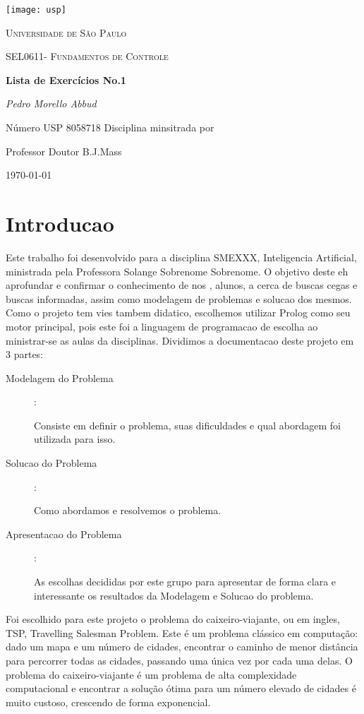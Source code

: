 \documentclass[12pt,a4paper]{article}
\begin{document}
\begin{titlepage}
  \centering
  \texttt{[image: usp]}\par\vspace{1cm}
  {\scshape\LARGE Universidade de São Paulo\par}
  \vspace{1cm}
  {\scshape\Large SEL0611- Fundamentos de Controle\par}
  \vspace{1.5cm}
  {\huge\bfseries Lista de Exercícios No.1\par}
  \vspace{2cm}
  {\Large\itshape Pedro Morello Abbud \par}
  \vspace{1cm}
  Número USP 8058718
  \vfill
  Disciplina minsitrada por\par
  Professor Doutor B.J.Mass

  \vfill 
  {\large \today\par}
\end{titlepage}
\newpage
\section{Introducao}
Este trabalho foi desenvolvido para a disciplina SMEXXX, Inteligencia Artificial, ministrada pela Professora Solange Sobrenome Sobrenome. O objetivo deste eh aprofundar e confirmar o conhecimento de nos , alunos, a cerca de buscas cegas e buscas informadas, assim como modelagem de problemas e solucao dos mesmos. Como o projeto tem vies tambem didatico, escolhemos utilizar Prolog como seu motor principal, pois este foi a linguagem de programacao de escolha ao ministrar-se as aulas da disciplinas. Dividimos a documentacao deste projeto em 3 partes:
\begin{description}
  \item [Modelagem do Problema]:

Consiste em definir o problema, suas dificuldades e qual abordagem foi utilizada para isso.
\item [Solucao do Problema]:

Como abordamos e resolvemos o problema.
\item[Apresentacao do Problema]:

As escolhas decididas por este grupo para apresentar de forma clara e interessante os resultados da Modelagem e Solucao do problema.
\end{description}
Foi escolhido para este projeto o problema do caixeiro-viajante, ou em ingles, TSP, Travelling Salesman Problem. Este é um problema clássico em computação: dado um mapa e um número de cidades, encontrar o caminho de menor distância para percorrer todas as cidades, passando uma única vez por cada uma delas. O problema do caixeiro-viajante é um problema de alta complexidade computacional e encontrar a solução ótima para um número elevado de cidades é muito custoso, crescendo de forma exponencial. 
\end{document}
